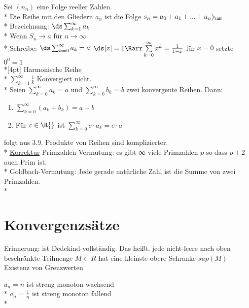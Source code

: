 %
\wdh
Sei $(n_n)$ eine Folge reeller Zahlen.\\*
Die Reihe mit den Gliedern $a_n$ ist die Folge $s_n = a_0 + a_1 + ... + a_n)_\nN$ \\*
Bezeichnung: $\ds\sum_{k=1}^{\infty} a_k$\\*
Wenn $S_n \to a$ für $n \to \infty$\\*
Schreibe: $\ds\sum_{k = 0}^{\infty} a_k = a$
$\ds|x| = 1 \Rarr \sum\limits_{k = 0}^{\infty} x^k = \frac{1}{1-x}$ für $x = 0$ setzte $0^0 = 1$\\*[4pt]
Harmonische Reihe\\*
$\displaystyle\sum\limits_{k = 1}^{\infty} \frac{1}{k}$ Konvergiert nicht.\\*
Seien $\sum\limits_{k = 0}^{\infty} a_k = a$ und $\sum\limits_{k = 0}^{\infty} b_k = b$ zwei konvergente Reihen. Dann:
\begin{enumerate}
\item{$\sum\limits_{k = 0}^{\infty} (a_k + b_k) = a + b$}
\item{Für $c \in \R{}$ ist $\sum\limits_{k = 0}^{\infty} c \cdot a_k = c \cdot a$}
\end{enumerate}
\bew
folgt aus 3.9.
\bem
Produkte von Reihen sind komplizierter.\\*
\ul{Korrektur}
Primzahlen-Vermutung: es gibt ∞ viele Primzahlen $p$ so dass $p + 2$ auch Prim ist.\\*
Goldbach-Vermutung: Jede gerade natürliche Zahl ist die Summe von zwei Primzahlen.\\*
\chapter{Konvergenzsätze}
Erinnerung: \R{} ist Dedekind-vollständig. Das heißt, jede nicht-leere nach oben beschränkte Teilmenge $M \subset R$ hat eine kleinste obere Schranke $sup(M)$\ \Rarr{} Existenz von Grenzwerten

\bsp
$a_n = n$ ist streng monoton wachsend\\*
$a_n = \frac{1}{n}$ ist streng monoton fallend\\*

